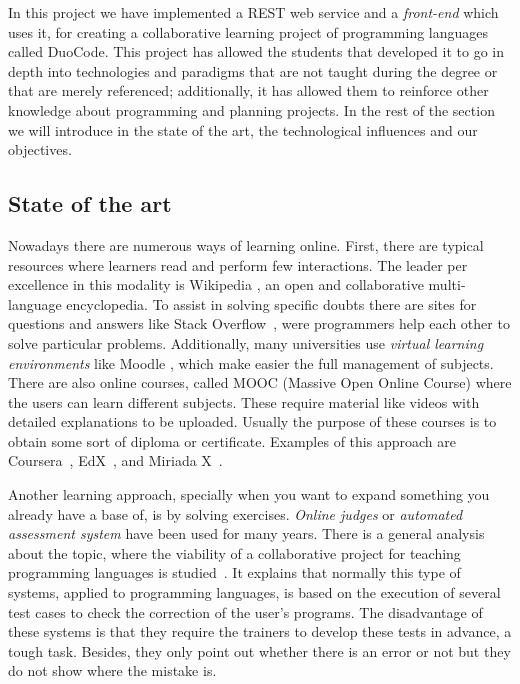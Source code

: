 
In this project we have implemented a REST web service and a \emph{front-end} which uses it, for creating a collaborative learning project of programming languages called DuoCode. This project has allowed the students that developed it to go in depth into technologies and paradigms that are not taught during the degree or that are merely referenced; additionally, it has allowed them to reinforce other knowledge about programming and planning projects. In the rest of the section we will introduce in the state of the art, the technological influences and our objectives.

\subsection{State of the art\label{subsec:state_art}}

Nowadays there are numerous ways of learning online. First, there are typical resources where learners read and perform few interactions. The leader per excellence in this modality is Wikipedia \cite{wiki}, an open and collaborative multi-language encyclopedia. To assist in solving specific doubts there are sites for questions and answers like Stack Overflow~\cite{stack}, were programmers help each other to solve particular problems. Additionally, many universities use \emph{virtual learning environments} like Moodle \cite{moodle}, which make easier the full management of subjects. There are also online courses, called MOOC (Massive Open Online Course) where the users can learn different subjects. These require material like videos with detailed explanations to be uploaded. Usually the purpose of these courses is to obtain some sort of diploma or certificate. Examples of this approach are Coursera~\cite{coursera}, EdX~\cite{edX}, and Miriada X~\cite{miriadaX}.

Another learning approach, specially when you want to expand something you already have a base of, is by solving exercises. \emph{Online judges} or \emph{automated assessment system} have been used for many years. There is a general analysis about the topic, where the viability of a collaborative project for teaching programming languages is studied~\cite{pimcdDuoCode14}. It explains that normally this type of systems, applied to programming languages, is based on the execution of several test cases to check the correction of the user's programs. The disadvantage of these systems is that they require the trainers to develop these tests in advance, a tough task. Besides, they only point out whether there is an error or not but they do not show where the mistake is.

